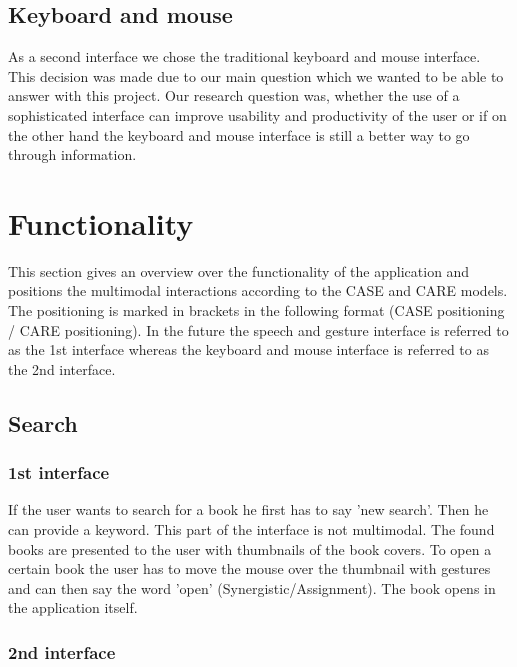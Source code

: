 \documentclass[a4paper, 10pt]{article}
\begin{document}
	\subsection{Keyboard and mouse}
	
	\par{As a second interface we chose the traditional keyboard and mouse interface. This decision was made due to our main question which we wanted to be able to answer with this project. Our research question was, whether the use of a sophisticated interface can improve usability and productivity of the user or if on the other hand the keyboard and mouse interface is still a better way to go through information.}
	
	
	\section{Functionality}
	
	\par{This section gives an overview over the functionality of the application and positions the multimodal interactions according to the CASE and CARE models. The positioning is marked in brackets in the following format (CASE positioning / CARE positioning). In the future the speech and gesture interface is referred to as the 1st interface whereas the keyboard and mouse interface is referred to as the 2nd interface.}
	
	\subsection{Search}
	
	\subsubsection{1st interface}
	
	\par{If the user wants to search for a book he first has to say 'new search'. Then he can provide a keyword. This part of the interface is not multimodal. The found books are presented to the user with thumbnails of the book covers. To open a certain book the user has to move the mouse over the thumbnail with gestures and can then say the word 'open'  (Synergistic/Assignment). The book opens in the application itself.}
	
	\subsubsection{2nd interface}
	
\end{document}
